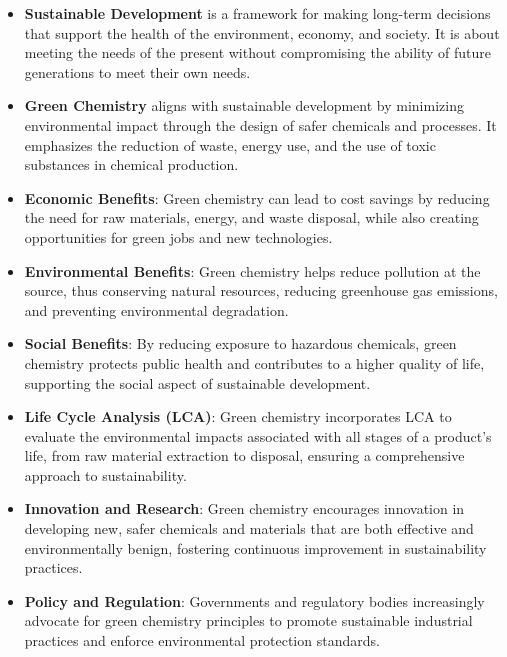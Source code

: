 \documentclass[11pt]{article}
\begin{document}
\begin{itemize}
	\item \textbf{Sustainable Development} is a framework for making long-term decisions that support the health of the environment, economy, and society. It is about meeting the needs of the present without compromising the ability of future generations to meet their own needs.

	\item \textbf{Green Chemistry} aligns with sustainable development by minimizing environmental impact through the design of safer chemicals and processes. It emphasizes the reduction of waste, energy use, and the use of toxic substances in chemical production.

	\item \textbf{Economic Benefits}: Green chemistry can lead to cost savings by reducing the need for raw materials, energy, and waste disposal, while also creating opportunities for green jobs and new technologies.

	\item \textbf{Environmental Benefits}: Green chemistry helps reduce pollution at the source, thus conserving natural resources, reducing greenhouse gas emissions, and preventing environmental degradation.

	\item \textbf{Social Benefits}: By reducing exposure to hazardous chemicals, green chemistry protects public health and contributes to a higher quality of life, supporting the social aspect of sustainable development.

	\item \textbf{Life Cycle Analysis (LCA)}: Green chemistry incorporates LCA to evaluate the environmental impacts associated with all stages of a product's life, from raw material extraction to disposal, ensuring a comprehensive approach to sustainability.

	\item \textbf{Innovation and Research}: Green chemistry encourages innovation in developing new, safer chemicals and materials that are both effective and environmentally benign, fostering continuous improvement in sustainability practices.

	\item \textbf{Policy and Regulation}: Governments and regulatory bodies increasingly advocate for green chemistry principles to promote sustainable industrial practices and enforce environmental protection standards.
\end{itemize}
\end{document}
